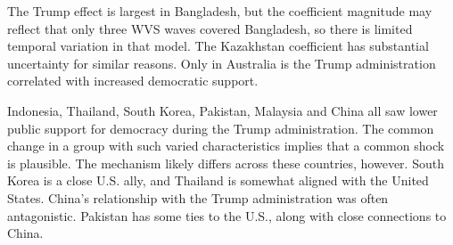 \documentclass[12pt]{article}
\begin{document}
The Trump effect is largest in Bangladesh, but the coefficient magnitude may reflect that only three WVS waves covered Bangladesh, so there is limited temporal variation in that model. 
The Kazakhstan coefficient has substantial uncertainty for similar reasons. 
Only in Australia is the Trump administration correlated with increased democratic support. 


Indonesia, Thailand, South Korea, Pakistan, Malaysia and China all saw lower public support for democracy during the Trump administration. 
The common change in a group with such varied characteristics implies that a common shock is plausible. 
The mechanism likely differs across these countries, however. 
South Korea is a close U.S. ally, and Thailand is somewhat aligned with the United States.
China's relationship with the Trump administration was often antagonistic. 
Pakistan has some ties to the U.S., along with close connections to China. 
  
  
  \newpage
 
\end{document}
